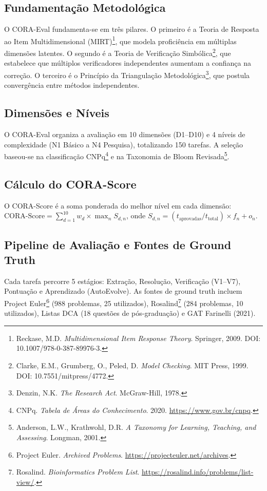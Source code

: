 \documentclass[12pt,a4paper,oneside]{article}
\begin{document}
\subsection{Fundamentação Metodológica}

O CORA-Eval fundamenta-se em três pilares. O primeiro é a Teoria de Resposta
ao Item Multidimensional (MIRT)\footnote{Reckase, M.D. \textit{Multidimensional
Item Response Theory}. Springer, 2009. DOI: 10.1007/978-0-387-89976-3.}, que
modela proficiência em múltiplas dimensões latentes. O segundo é a Teoria de
Verificação Simbólica\footnote{Clarke, E.M., Grumberg, O., Peled, D.
\textit{Model Checking}. MIT Press, 1999. DOI: 10.7551/mitpress/4772.}, que
estabelece que múltiplos verificadores independentes aumentam a confiança na
correção. O terceiro é o Princípio da Triangulação Metodológica\footnote{Denzin, N.K. \textit{The Research Act}. McGraw-Hill, 1978.}, que postula convergência
entre métodos independentes.

\subsection{Dimensões e Níveis}

O CORA-Eval organiza a avaliação em 10 dimensões (D1--D10) e 4 níveis de
complexidade (N1 Básico a N4 Pesquisa), totalizando 150 tarefas. A seleção
baseou-se na classificação CNPq\footnote{CNPq. \textit{Tabela de Áreas do
Conhecimento}. 2020. \url{https://www.gov.br/cnpq}.} e na Taxonomia de Bloom
Revisada\footnote{Anderson, L.W., Krathwohl, D.R. \textit{A Taxonomy for
Learning, Teaching, and Assessing}. Longman, 2001.}.

\subsection{Cálculo do CORA-Score}

O CORA-Score é a soma ponderada do melhor nível em cada dimensão:
$\text{CORA-Score} = \sum_{d=1}^{10} w_d \times \max_n S_{d,n}$, onde
$S_{d,n} = (t_{\text{aprovadas}}/t_{\text{total}}) \times f_n + o_n$.

\subsection{Pipeline de Avaliação e Fontes de Ground Truth}

Cada tarefa percorre 5 estágios: Extração, Resolução, Verificação (V1--V7),
Pontuação e Aprendizado (AutoEvolve). As fontes de ground truth incluem
Project Euler\footnote{Project Euler. \textit{Archived Problems}.
\url{https://projecteuler.net/archives}.} (988 problemas, 25 utilizados),
Rosalind\footnote{Rosalind. \textit{Bioinformatics Problem List}.
\url{https://rosalind.info/problems/list-view/}.} (284 problemas, 10
utilizados), Listas DCA (18 questões de pós-graduação) e GAT Farinelli (2021).
\end{document}
